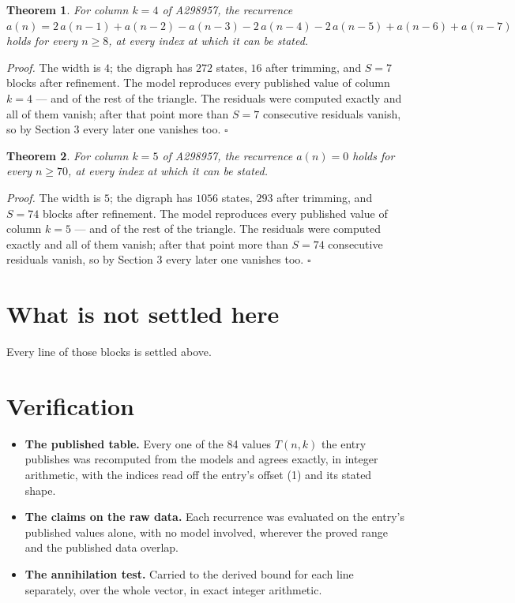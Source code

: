 \documentclass[11pt]{article}
\newtheorem{theorem}{Theorem}
\theoremstyle{definition}
\begin{document}
\begin{theorem} For column $k = 4$ of A298957, the recurrence $a(n) = 2\,a(n-1) + a(n-2) - a(n-3) - 2\,a(n-4) - 2\,a(n-5) + a(n-6) + a(n-7)$ holds for every $n \ge 8$, at every index at which it can be stated.\end{theorem}

{\itshape Proof.} The width is $4$; the digraph has $272$ states, $16$ after trimming, and $S = 7$ blocks after refinement. The model reproduces every published value of column $k = 4$ --- and of the rest of the triangle. The residuals were computed exactly and all of them vanish; after that point more than $S = 7$ consecutive residuals vanish, so by Section 3 every later one vanishes too. $\square$

\begin{theorem} For column $k = 5$ of A298957, the recurrence $a(n) = 0$ holds for every $n \ge 70$, at every index at which it can be stated.\end{theorem}

{\itshape Proof.} The width is $5$; the digraph has $1056$ states, $293$ after trimming, and $S = 74$ blocks after refinement. The model reproduces every published value of column $k = 5$ --- and of the rest of the triangle. The residuals were computed exactly and all of them vanish; after that point more than $S = 74$ consecutive residuals vanish, so by Section 3 every later one vanishes too. $\square$

\section{What is not settled here}

Every line of those blocks is settled above.

\section{Verification}

\begin{itemize}

\item {\bfseries The published table.} Every one of the 84 values $T(n,k)$ the entry publishes was recomputed from the models and agrees exactly, in integer arithmetic, with the indices read off the entry's offset (1) and its stated shape.

\item {\bfseries The claims on the raw data.} Each recurrence was evaluated on the entry's published values alone, with no model involved, wherever the proved range and the published data overlap.

\item {\bfseries The annihilation test.} Carried to the derived bound for each line separately, over the whole vector, in exact integer arithmetic.

\end{itemize}
\end{document}
